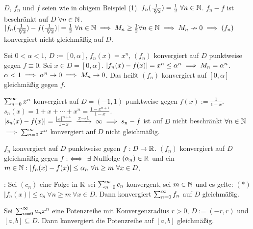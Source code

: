 \documentclass[a4paper,twoside,DIV15,BCOR12mm]{scrbook}
\begin{document}
\begin{beispiele}
\item $D$, $f_n$ und $f$ seien wie in obigem Beispiel (1). $f_n(\frac{1}{\sqrt[n]{2}}) = \frac{1}{2} \ \forall n\in\mathbb{N}$. $f_n - f$ ist beschränkt auf $D$ $\forall n\in\mathbb{N}$. $|f_n(\frac{1}{\sqrt[n]{2}}) - f(\frac{1}{\sqrt[n]{2}})| = \frac{1}{2} \ \forall n\in\mathbb{N} \implies M_n \ge \frac{1}{2} \forall n\in\mathbb{N} \implies M_n \nrightarrow 0 \implies (f_n)$ konvergiert nicht gleichmäßig auf $D$.

\item Sei $0<\alpha<1$, $D:=[0,\alpha]$, $f_n(x)=x^n$, $(f_n)$ konvergiert auf $D$ punktweise gegen $f\equiv0$. Sei $x\in D = [0,\alpha]$. $|f_n(x) - f(x)| = x^n \le \alpha^n \implies M_n = \alpha^n$. $\alpha < 1 \implies \alpha^n \to 0 \implies M_n \to 0$. Das heißt $(f_n)$ konvergiert auf $[0,\alpha]$ gleichmäßig gegen $f$.

\item $\sum_{n=0}^{\infty}{x^n}$ konvergiert auf $D= (-1,1)$ punktweise gegen $f(x) := \frac{1}{1-x}$. $s_n(x) = 1 + x+ \cdots +x^n = \frac{1-x^{n+1}}{1-x}$. $|s_n(x) - f(x)| = \frac{|x|^{n+1}}{1-x} \towegen{x\to1} \infty \folgt s_n - f$ ist auf $D$ nicht beschränkt $\forall n\in\mathbb{N}$ $\implies \sum_{n=0}^{\infty}{x^n}$ konvergiert auf $D$ nicht gleichmäßig.

\end{beispiele}

\begin{satz}[Funktionskonvergenzkriterien]
\begin{liste}
\item $f_n$ konvergiert auf $D$ punktweise gegen $f:D\to\mathbb{R}$. $(f_n)$ konvergiert auf $D$ gleichmäßig gegen $f$ $:\iff$ $\exists$ Nullfolge $(\alpha_n) \in \mathbb{R}$ und ein $m\in\MdN: |f_n(x) - f(x)| \le \alpha_n \ \forall n\ge m \ \forall x \in D$.
\item {}: Sei $(c_n)$ eine Folge in $\mathbb{R}$ sei $\sum_{n=0}^{\infty}{c_n}$ konvergent, sei $m\in\mathbb{N}$ und es gelte: $(*)$ $|f_n(x)| \le c_n \ \forall n\ge m \ \forall x\in D$. Dann konvergiert $\sum_{n=0}^{\infty}{f_n}$ auf $D$ gleichmäßig.
\item Sei $\sum_{n=0}^{\infty}{a_nx^n}$ eine Potenzreihe mit Konvergenzradius $r>0$, $D:= (-r,r)$ und $[a,b] \subseteq D$. Dann konvergiert die Potenzreihe auf $[a,b]$ gleichmäßig.
\end{liste}
\end{satz}
\end{document}
